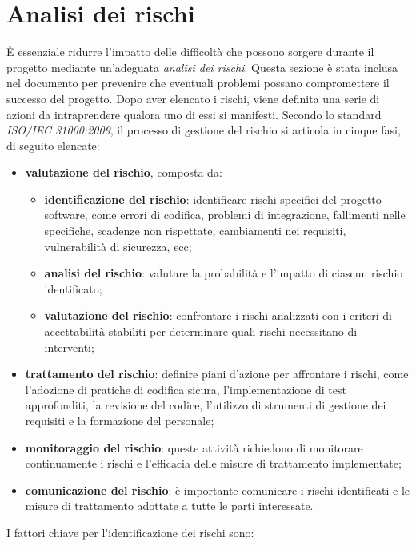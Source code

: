 \section{Analisi dei rischi} %
È essenziale ridurre l'impatto delle difficoltà che possono sorgere durante il progetto mediante un'adeguata \textit{analisi dei rischi}.
Questa sezione è stata inclusa nel documento per prevenire che eventuali problemi possano compromettere il successo del progetto. Dopo aver elencato i rischi, viene definita una serie di azioni da intraprendere qualora uno di essi si manifesti. Secondo lo standard \textit{ISO/IEC 31000:2009}, il processo di gestione del rischio si articola in cinque fasi, di seguito elencate:
\begin{itemize}
	\item \textbf{valutazione del rischio}, composta da:
	      \begin{itemize}
		      \item \textbf{identificazione del rischio}: identificare rischi specifici del progetto software, come errori di codifica, problemi di integrazione, fallimenti nelle specifiche, scadenze non rispettate, cambiamenti nei requisiti, vulnerabilità di sicurezza, ecc;
		      \item \textbf{analisi del rischio}: valutare la probabilità e l'impatto di ciascun rischio identificato;
		      \item \textbf{valutazione del rischio}: confrontare i rischi analizzati con i criteri di accettabilità stabiliti per determinare quali rischi necessitano di interventi;
	      \end{itemize}
	\item \textbf{trattamento del rischio}: definire piani d'azione per affrontare i rischi, come l'adozione di pratiche di codifica sicura, l'implementazione di test approfonditi, la revisione del codice, l'utilizzo di strumenti di gestione dei requisiti e la formazione del personale;
	\item \textbf{monitoraggio del rischio}: queste attività richiedono di monitorare continuamente i rischi e l'efficacia delle misure di trattamento implementate;
	\item \textbf{comunicazione del rischio}: è importante comunicare i rischi identificati e le misure di trattamento adottate a tutte le parti interessate.
\end{itemize}
I fattori chiave per l'identificazione dei rischi sono:
